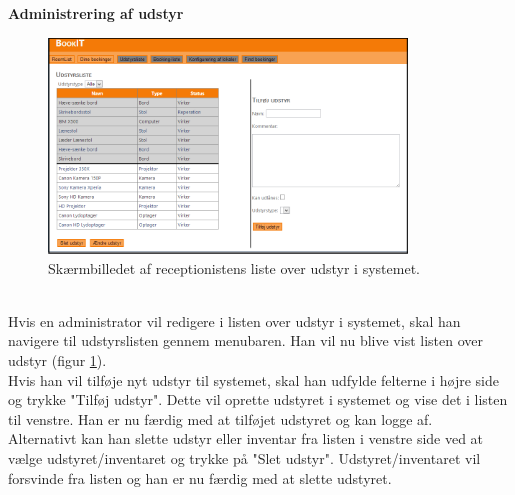 \textbf{Administrering af udstyr}
\begin{figure}[h!]
  \centering
    \includegraphics[width=0.85\textwidth]{Appendix/GUI-Prototype/DigitalMockup/UdstyrsListe}
  \caption{Skærmbilledet af receptionistens liste over udstyr i systemet.}
\label{Design_G_Development_UdstyrsListe_Final}
\end{figure} 
\\Hvis en administrator vil redigere i listen over udstyr i systemet, skal han navigere til udstyrslisten gennem menubaren. Han vil nu blive vist listen over udstyr (figur \ref{Design_G_Development_UdstyrsListe_Final}). 
\\Hvis han vil tilføje nyt udstyr til systemet, skal han udfylde felterne i højre side og trykke "Tilføj udstyr". Dette vil oprette udstyret i systemet og vise det i listen til venstre. Han er nu færdig med at tilføjet udstyret og kan logge af.
\\Alternativt kan han slette udstyr eller inventar fra listen i venstre side ved at vælge udstyret/inventaret og trykke på "Slet udstyr". Udstyret/inventaret vil forsvinde fra listen og han er nu færdig med at slette udstyret.

